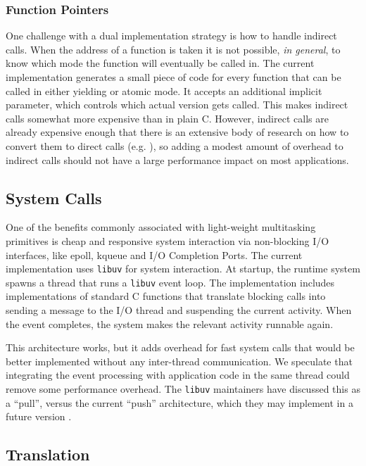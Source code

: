 \documentclass[acmsmall,anonymous,review]{acmart}\settopmatter{printfolios=true,printccs=false,printacmref=false}
\begin{document}
\subsubsection{Function Pointers}

One challenge with a dual implementation strategy is how to handle indirect calls.
When the address of a function is taken it is not possible, \emph{in general}, to know which mode the function will eventually be called in.
The current implementation generates a small piece of code for every function that can be called in either yielding or atomic mode.
It accepts an additional implicit parameter, which controls which actual version gets called.
This makes indirect calls somewhat more expensive than in plain C.
However, indirect calls are already expensive enough that there is an extensive body of research on how to convert them to direct calls (e.g. \cite{Dean1995}), so adding a modest amount of overhead to indirect calls should not have a large performance impact on most applications.

\subsection{System Calls}

One of the benefits commonly associated with light-weight multitasking primitives is cheap and responsive system interaction via non-blocking I/O interfaces, like epoll, kqueue and I/O Completion Ports.
The current \charcoal{} implementation uses \texttt{libuv} for system interaction.
At startup, the runtime system spawns a thread that runs a \texttt{libuv} event loop.
The \charcoal{} implementation includes implementations of standard C functions that translate blocking calls into sending a message to the I/O thread and suspending the current activity.
When the event completes, the system makes the relevant activity runnable again.

This architecture works, but it adds overhead for fast system calls that would be better implemented without any inter-thread communication.
We speculate that integrating the event processing with application code in the same thread could remove some performance overhead.
The \texttt{libuv} maintainers have discussed this as a ``pull'', versus the current ``push'' architecture, which they may implement in a future version \cite{libuv2014}.

\subsection{Translation}
\end{document}
